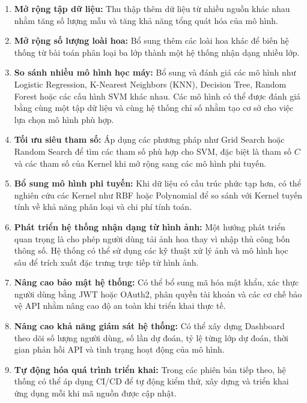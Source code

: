 \documentclass[14pt]{extarticle}
\begin{document}
	\begin{enumerate}[leftmargin=*]
		
	
		\item \textbf{Mở rộng tập dữ liệu:} Thu thập thêm dữ liệu từ nhiều nguồn khác nhau nhằm tăng số lượng mẫu và tăng khả năng tổng quát hóa của mô hình.
		
		\item \textbf{Mở rộng số lượng loài hoa:} Bổ sung thêm các loài hoa khác để biến hệ thống từ bài toán phân loại ba lớp thành một hệ thống nhận dạng nhiều lớp.
		
		\item \textbf{So sánh nhiều mô hình học máy:} Bổ sung và đánh giá các mô hình như Logistic Regression, K-Nearest Neighbors (KNN), Decision Tree, Random Forest hoặc các cấu hình SVM khác nhau. Các mô hình có thể được đánh giá bằng cùng một tập dữ liệu và cùng hệ thống chỉ số nhằm tạo cơ sở cho việc lựa chọn mô hình phù hợp.
		
		\item \textbf{Tối ưu siêu tham số:} Áp dụng các phương pháp như Grid Search hoặc Random Search để tìm các tham số phù hợp cho SVM, đặc biệt là tham số $C$ và các tham số của Kernel khi mở rộng sang các mô hình phi tuyến.
		
		\item \textbf{Bổ sung mô hình phi tuyến:} Khi dữ liệu có cấu trúc phức tạp hơn, có thể nghiên cứu các Kernel như RBF hoặc Polynomial để so sánh với Kernel tuyến tính về khả năng phân loại và chi phí tính toán.
		
		\item \textbf{Phát triển hệ thống nhận dạng từ hình ảnh:} Một hướng phát triển quan trọng là cho phép người dùng tải ảnh hoa thay vì nhập thủ công bốn thông số. Hệ thống có thể sử dụng các kỹ thuật xử lý ảnh và mô hình học sâu để trích xuất đặc trưng trực tiếp từ hình ảnh.
		
		\item \textbf{Nâng cao bảo mật hệ thống:} Có thể bổ sung mã hóa mật khẩu, xác thực người dùng bằng JWT hoặc OAuth2, phân quyền tài khoản và các cơ chế bảo vệ API nhằm nâng cao độ an toàn khi triển khai thực tế.
		
		\item \textbf{Nâng cao khả năng giám sát hệ thống:} Có thể xây dựng Dashboard theo dõi số lượng người dùng, số lần dự đoán, tỷ lệ từng lớp dự đoán, thời gian phản hồi API và tình trạng hoạt động của mô hình.
		
		\item \textbf{Tự động hóa quá trình triển khai:} Trong các phiên bản tiếp theo, hệ thống có thể áp dụng CI/CD để tự động kiểm thử, xây dựng và triển khai ứng dụng mỗi khi mã nguồn được cập nhật.
		
		
	\end{enumerate}
	
\end{document}
